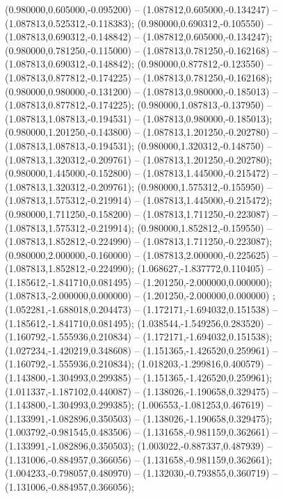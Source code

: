  (0.980000,0.605000,-0.095200) -- (1.087812,0.605000,-0.134247) -- (1.087813,0.525312,-0.118383);
 (0.980000,0.690312,-0.105550) -- (1.087813,0.690312,-0.148842) -- (1.087812,0.605000,-0.134247);
 (0.980000,0.781250,-0.115000) -- (1.087813,0.781250,-0.162168) -- (1.087813,0.690312,-0.148842);
 (0.980000,0.877812,-0.123550) -- (1.087813,0.877812,-0.174225) -- (1.087813,0.781250,-0.162168);
 (0.980000,0.980000,-0.131200) -- (1.087813,0.980000,-0.185013) -- (1.087813,0.877812,-0.174225);
 (0.980000,1.087813,-0.137950) -- (1.087813,1.087813,-0.194531) -- (1.087813,0.980000,-0.185013);
 (0.980000,1.201250,-0.143800) -- (1.087813,1.201250,-0.202780) -- (1.087813,1.087813,-0.194531);
 (0.980000,1.320312,-0.148750) -- (1.087813,1.320312,-0.209761) -- (1.087813,1.201250,-0.202780);
 (0.980000,1.445000,-0.152800) -- (1.087813,1.445000,-0.215472) -- (1.087813,1.320312,-0.209761);
 (0.980000,1.575312,-0.155950) -- (1.087813,1.575312,-0.219914) -- (1.087813,1.445000,-0.215472);
 (0.980000,1.711250,-0.158200) -- (1.087813,1.711250,-0.223087) -- (1.087813,1.575312,-0.219914);
 (0.980000,1.852812,-0.159550) -- (1.087813,1.852812,-0.224990) -- (1.087813,1.711250,-0.223087);
 (0.980000,2.000000,-0.160000) -- (1.087813,2.000000,-0.225625) -- (1.087813,1.852812,-0.224990);
 (1.068627,-1.837772,0.110405) -- (1.185612,-1.841710,0.081495) -- (1.201250,-2.000000,0.000000);
 (1.087813,-2.000000,0.000000) -- (1.201250,-2.000000,0.000000) ;
 (1.052281,-1.688018,0.204473) -- (1.172171,-1.694032,0.151538) -- (1.185612,-1.841710,0.081495);
 (1.038544,-1.549256,0.283520) -- (1.160792,-1.555936,0.210834) -- (1.172171,-1.694032,0.151538);
 (1.027234,-1.420219,0.348608) -- (1.151365,-1.426520,0.259961) -- (1.160792,-1.555936,0.210834);
 (1.018203,-1.299816,0.400579) -- (1.143800,-1.304993,0.299385) -- (1.151365,-1.426520,0.259961);
 (1.011337,-1.187102,0.440087) -- (1.138026,-1.190658,0.329475) -- (1.143800,-1.304993,0.299385);
 (1.006553,-1.081253,0.467619) -- (1.133991,-1.082896,0.350503) -- (1.138026,-1.190658,0.329475);
 (1.003792,-0.981545,0.483506) -- (1.131658,-0.981159,0.362661) -- (1.133991,-1.082896,0.350503);
 (1.003022,-0.887337,0.487939) -- (1.131006,-0.884957,0.366056) -- (1.131658,-0.981159,0.362661);
 (1.004233,-0.798057,0.480970) -- (1.132030,-0.793855,0.360719) -- (1.131006,-0.884957,0.366056);
